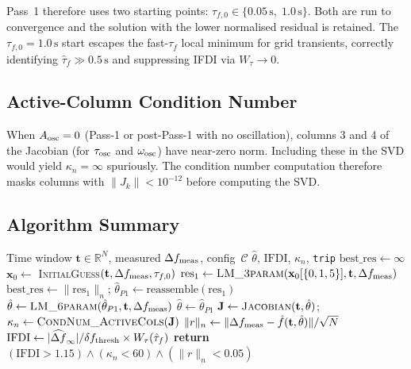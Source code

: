 \documentclass[11pt, a4paper]{article}
\newcommand{\kn}{\kappa_n}
\newcommand{\dfhat}{\widehat{\Delta f}_\infty}
\newcommand{\taufhat}{\hat{\tau}_f}
\newcommand{\IFDI}{\mathrm{IFDI}}
\newcommand{\Wtau}{W_\tau}
\begin{document}
Pass~1 therefore uses two starting points:
$\tau_{f,0} \in \{0.05\,\text{s},\;1.0\,\text{s}\}$.
Both are run to convergence and the solution with the lower normalised
residual is retained.  The $\tau_{f,0} = 1.0\,\text{s}$ start escapes the
fast-$\tau_f$ local minimum for grid transients, correctly identifying
$\taufhat \gg 0.5\,\text{s}$ and suppressing IFDI via $\Wtau \to 0$.

\subsection{Active-Column Condition Number}

When $A_{\rm osc} = 0$ (Pass-1 or post-Pass-1 with no oscillation), columns
3 and 4 of the Jacobian (for $\tau_{\rm osc}$ and $\omega_{\rm osc}$) have
near-zero norm.  Including these in the SVD would yield $\kn = \infty$
spuriously.  The condition number computation therefore masks columns with
$\|J_k\| < 10^{-12}$ before computing the SVD.

\subsection{Algorithm Summary}

\begin{algorithm}[h]
\caption{Two-pass IFDI estimator for a single relay window.}
\label{alg:ifdi}
\begin{algorithmic}[1]
\Require Time window $\mathbf{t} \in \mathbb{R}^N$, measured $\Delta f_{\rm meas}$,
         config~$\mathcal{C}$
\Ensure $\hat{\theta}$, $\IFDI$, $\kn$, \texttt{trip}
\State $\text{best\_res} \gets \infty$
  \State $\mathbf{x}_0 \gets$ \textsc{InitialGuess}$(\mathbf{t}, \Delta f_{\rm meas}, \tau_{f,0})$
  \State $\text{res}_1 \gets \textsc{LM\_3param}(\mathbf{x}_0[\{0,1,5\}],
    \mathbf{t}, \Delta f_{\rm meas})$
    $\text{best\_res} \gets \|\text{res}_1\|_n$;
    $\hat{\theta}_{P1} \gets \text{reassemble}(\text{res}_1)$
  \EndIf
\EndFor
{}
  \State $\hat{\theta} \gets \textsc{LM\_6param}(\hat{\theta}_{P1},
    \mathbf{t}, \Delta f_{\rm meas})$ 
\Else
  \State $\hat{\theta} \gets \hat{\theta}_{P1}$ 
\EndIf
\State $\mathbf{J} \gets \textsc{Jacobian}(\mathbf{t}, \hat{\theta})$;
  $\kn \gets \textsc{CondNum\_ActiveCols}(\mathbf{J})$
\State $\|r\|_n \gets \|\Delta f_{\rm meas} - \hat{f}(\mathbf{t}, \hat{\theta})\|
  / \sqrt{N}$
\State $\IFDI \gets |\dfhat| / \delta f_{\rm thresh} \times \Wtau(\taufhat)$
\State \textbf{return} $(\IFDI > 1.15) \wedge (\kn < 60) \wedge (\|r\|_n < 0.05)$
\end{algorithmic}
\end{algorithm}
\end{document}
